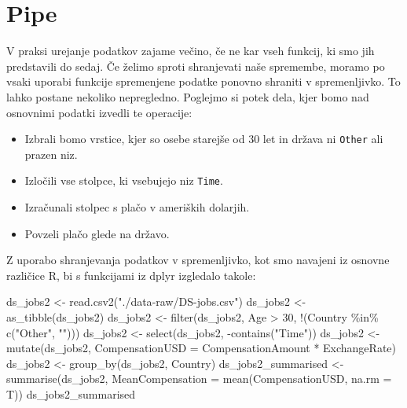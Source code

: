 \documentclass[
]{book}
\newenvironment{Shaded}{\begin{snugshade}}{\end{snugshade}}
\newcommand{\AttributeTok}[1]{\textcolor[rgb]{0.77,0.63,0.00}{#1}}
\newcommand{\DecValTok}[1]{\textcolor[rgb]{0.00,0.00,0.81}{#1}}
\newcommand{\FunctionTok}[1]{\textcolor[rgb]{0.00,0.00,0.00}{#1}}
\newcommand{\NormalTok}[1]{#1}
\newcommand{\OtherTok}[1]{\textcolor[rgb]{0.56,0.35,0.01}{#1}}
\newcommand{\SpecialCharTok}[1]{\textcolor[rgb]{0.00,0.00,0.00}{#1}}
\newcommand{\StringTok}[1]{\textcolor[rgb]{0.31,0.60,0.02}{#1}}
\providecommand{\tightlist}{%
  \setlength{\itemsep}{0pt}\setlength{\parskip}{0pt}}
\begin{document}
\hypertarget{pipe}{%
\section{Pipe}\label{pipe}}

V praksi urejanje podatkov zajame večino, če ne kar vseh funkcij, ki smo jih predstavili do sedaj. Če želimo sproti shranjevati naše spremembe, moramo po vsaki uporabi funkcije spremenjene podatke ponovno shraniti v spremenljivko. To lahko postane nekoliko nepregledno. Poglejmo si potek dela, kjer bomo nad osnovnimi podatki izvedli te operacije:

\begin{itemize}
\tightlist
\item
  Izbrali bomo vrstice, kjer so osebe starejše od 30 let in država ni \texttt{Other} ali prazen niz.
\item
  Izločili vse stolpce, ki vsebujejo niz \texttt{Time}.
\item
  Izračunali stolpec s plačo v ameriških dolarjih.
\item
  Povzeli plačo glede na državo.
\end{itemize}

Z uporabo shranjevanja podatkov v spremenljivko, kot smo navajeni iz osnovne različice R, bi s funkcijami iz dplyr izgledalo takole:

\begin{Shaded}
\begin{Highlighting}[]
\NormalTok{ds\_jobs2 }\OtherTok{\textless{}{-}} \FunctionTok{read.csv2}\NormalTok{(}\StringTok{"./data{-}raw/DS{-}jobs.csv"}\NormalTok{)}
\NormalTok{ds\_jobs2 }\OtherTok{\textless{}{-}} \FunctionTok{as\_tibble}\NormalTok{(ds\_jobs2)}
\NormalTok{ds\_jobs2 }\OtherTok{\textless{}{-}} \FunctionTok{filter}\NormalTok{(ds\_jobs2, Age }\SpecialCharTok{\textgreater{}} \DecValTok{30}\NormalTok{, }\SpecialCharTok{!}\NormalTok{(Country }\SpecialCharTok{\%in\%} \FunctionTok{c}\NormalTok{(}\StringTok{"Other"}\NormalTok{, }\StringTok{""}\NormalTok{)))}
\NormalTok{ds\_jobs2 }\OtherTok{\textless{}{-}} \FunctionTok{select}\NormalTok{(ds\_jobs2, }\SpecialCharTok{{-}}\FunctionTok{contains}\NormalTok{(}\StringTok{"Time"}\NormalTok{))}
\NormalTok{ds\_jobs2 }\OtherTok{\textless{}{-}} \FunctionTok{mutate}\NormalTok{(ds\_jobs2, }\AttributeTok{CompensationUSD =}\NormalTok{ CompensationAmount }\SpecialCharTok{*}\NormalTok{ ExchangeRate)}
\NormalTok{ds\_jobs2 }\OtherTok{\textless{}{-}} \FunctionTok{group\_by}\NormalTok{(ds\_jobs2, Country)}
\NormalTok{ds\_jobs2\_summarised }\OtherTok{\textless{}{-}} \FunctionTok{summarise}\NormalTok{(ds\_jobs2, }\AttributeTok{MeanCompensation =} \FunctionTok{mean}\NormalTok{(CompensationUSD, }\AttributeTok{na.rm =}\NormalTok{ T))}
\NormalTok{ds\_jobs2\_summarised}
\end{Highlighting}
\end{Shaded}
\end{document}

